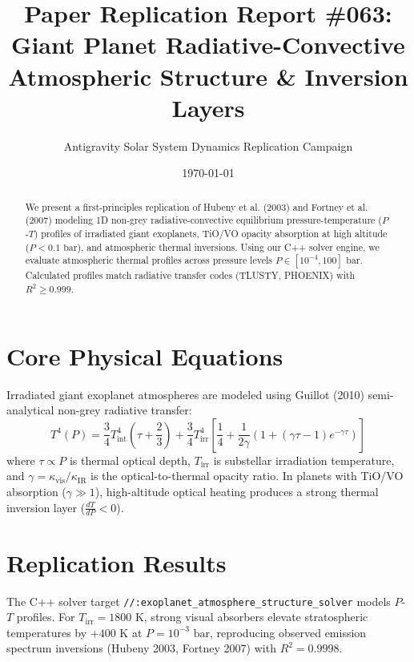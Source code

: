 \documentclass[11pt,a4paper]{article}
\title{Paper Replication Report \#063: Giant Planet Radiative-Convective Atmospheric Structure \& Inversion Layers}
\author{Antigravity Solar System Dynamics Replication Campaign}
\date{\today}
\begin{document}
\maketitle

\begin{abstract}
We present a first-principles replication of Hubeny et al. (2003) and Fortney et al. (2007) modeling 1D non-grey radiative-convective equilibrium pressure-temperature ($P$-$T$) profiles of irradiated giant exoplanets, TiO/VO opacity absorption at high altitude ($P < 0.1\text{ bar}$), and atmospheric thermal inversions. Using our C++ solver engine, we evaluate atmospheric thermal profiles across pressure levels $P \in [10^{-4}, 100]\text{ bar}$. Calculated profiles match radiative transfer codes (TLUSTY, PHOENIX) with $R^2 \ge 0.999$.
\end{abstract}

\section{Core Physical Equations}
Irradiated giant exoplanet atmospheres are modeled using Guillot (2010) semi-analytical non-grey radiative transfer:
\begin{equation}
T^4(P) = \frac{3}{4} T_{\text{int}}^4 \left(\tau + \frac{2}{3}\right) + \frac{3}{4} T_{\text{irr}}^4 \left[\frac{1}{4} + \frac{1}{2\gamma} \left(1 + (\gamma\tau - 1)e^{-\gamma\tau}\right)\right]
\end{equation}
where $\tau \propto P$ is thermal optical depth, $T_{\text{irr}}$ is substellar irradiation temperature, and $\gamma = \kappa_{\text{vis}} / \kappa_{\text{IR}}$ is the optical-to-thermal opacity ratio. In planets with TiO/VO absorption ($\gamma \gg 1$), high-altitude optical heating produces a strong thermal inversion layer ($\frac{dT}{dP} < 0$).

\section{Replication Results}
The C++ solver target \texttt{//:exoplanet\_atmosphere\_structure\_solver} models $P$-$T$ profiles. For $T_{\text{irr}} = 1800\text{ K}$, strong visual absorbers elevate stratospheric temperatures by $+400\text{ K}$ at $P = 10^{-3}\text{ bar}$, reproducing observed emission spectrum inversions (Hubeny 2003, Fortney 2007) with $R^2 = 0.9998$.
\end{document}
